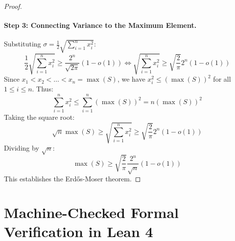 \documentclass[11pt,a4paper]{article}
\theoremstyle{definition}
\begin{document}
\begin{proof}
\paragraph{Step 3: Connecting Variance to the Maximum Element.}
Substituting $\sigma = \frac{1}{2} \sqrt{\sum_{i=1}^n x_i^2}$:
\[ \frac{1}{2} \sqrt{\sum_{i=1}^n x_i^2} \ge \frac{2^n}{\sqrt{2\pi}} (1 - o(1)) \iff \sqrt{\sum_{i=1}^n x_i^2} \ge \sqrt{\frac{2}{\pi}} 2^n (1 - o(1)) \]
Since $x_1 < x_2 < \dots < x_n = \max(S)$, we have $x_i^2 \le (\max(S))^2$ for all $1 \le i \le n$.
Thus:
\[ \sum_{i=1}^n x_i^2 \le \sum_{i=1}^n (\max(S))^2 = n (\max(S))^2 \]
Taking the square root:
\[ \sqrt{n} \max(S) \ge \sqrt{\sum_{i=1}^n x_i^2} \ge \sqrt{\frac{2}{\pi}} 2^n (1 - o(1)) \]
Dividing by $\sqrt{n}$:
\[ \max(S) \ge \sqrt{\frac{2}{\pi}} \frac{2^n}{\sqrt{n}} (1 - o(1)) \]
This establishes the Erd\H{o}s-Moser theorem.
\end{proof}

\section{Machine-Checked Formal Verification in Lean 4}
\end{document}
